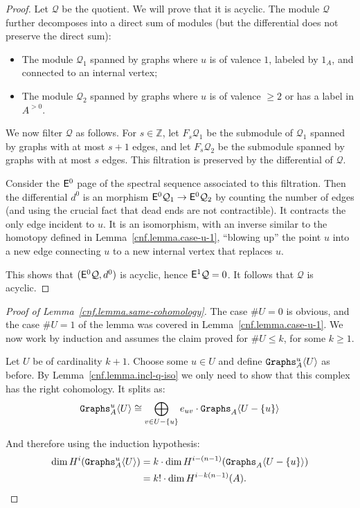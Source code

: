 \begin{proof}
  Let $\mathcal{Q}$ be the quotient.
  We will prove that it is acyclic.
  The module $\mathcal{Q}$ further decomposes into a direct sum of modules (but the differential does not preserve the direct sum):
  \begin{itemize}
  \item The module $\mathcal{Q}_{1}$ spanned by graphs where $u$ is of valence $1$, labeled by $1_{A}$, and connected to an internal vertex;
  \item The module $\mathcal{Q}_{2}$ spanned by graphs where $u$ is of valence $\geq 2$ or has a label in $A^{> 0}$.
  \end{itemize}

  We now filter $\mathcal{Q}$ as follows.
  For $s \in \mathbb{Z}$, let $F_{s} \mathcal{Q}_{1}$ be the submodule of $\mathcal{Q}_{1}$ spanned by graphs with at most $s+1$ edges, and let $F_{s} \mathcal{Q}_{2}$ be the submodule spanned by graphs with at most $s$ edges.
  This filtration is preserved by the differential of $\mathcal{Q}$.

  Consider the $\mathsf{E}^{0}$ page of the spectral sequence associated to this filtration.
  Then the differential $d^{0}$ is an morphism $\mathsf{E}^{0} \mathcal{Q}_{1} \to \mathsf{E}^{0} \mathcal{Q}_{2}$ by counting the number of edges (and using the crucial fact that dead ends are not contractible).
  It contracts the only edge incident to $u$.
  It is an isomorphism, with an inverse similar to the homotopy defined in Lemma~\ref{cnf.lemma.case-u-1}, ``blowing up'' the point $u$ into a new edge connecting $u$ to a new internal vertex that replaces $u$.

  This shows that $(\mathsf{E}^{0} \mathcal{Q}, d^{0})$ is acyclic, hence $\mathsf{E}^{1} \mathcal{Q} = 0$.
  It follows that $\mathcal{Q}$ is acyclic.
\end{proof}

\begin{proof}[Proof of Lemma~\ref{cnf.lemma.same-cohomology}]
  The case $\# U = 0$ is obvious, and the case $\# U = 1$ of the lemma was covered in Lemma~\ref{cnf.lemma.case-u-1}.
  We now work by induction and assumes the claim proved for $\# U \leq k$, for some $k \geq 1$.

  Let $U$ be of cardinality $k+1$.
  Choose some $u \in U$ and define $\mathtt{Graphs}^{u}_{A} \langle U \rangle$ as before.
  By Lemma~\ref{cnf.lemma.incl-q-iso} we only need to show that this complex has the right cohomology.
  It splits as:
  \begin{equation}
    \label{cnf.eq:13}
    \mathtt{Graphs}^{u}_{A} \langle U \rangle \cong \bigoplus_{v \in U - \{u\}} e_{uv} \cdot \mathtt{Graphs}_{A} \langle U - \{u\} \rangle
  \end{equation}

  And therefore using the induction hypothesis:
  \begin{align*}
    \dim H^{i}(\mathtt{Graphs}^{u}_{A} \langle U \rangle)
    & = k \cdot \dim H^{i - (n-1)} ( \mathtt{Graphs}_{A} \langle U - \{u\} \rangle ) \\
    & = k! \cdot \dim H^{i - k (n-1)}(A).
      \qedhere
  \end{align*}
\end{proof}

